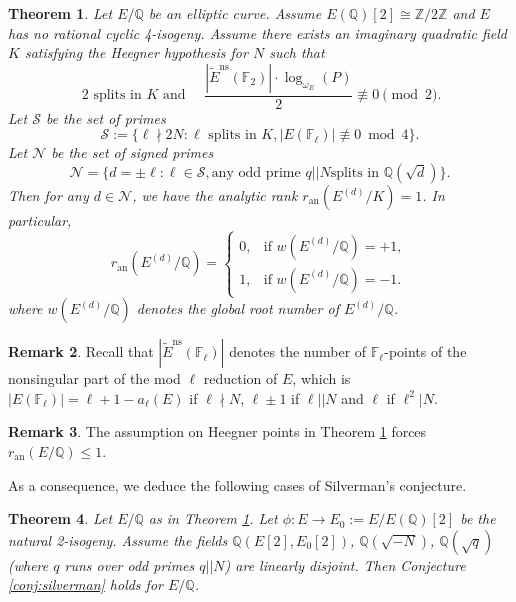 \documentclass[11pt]{amsart}
\newtheorem{theorem}{Theorem}[section]
\theoremstyle{definition}
\newtheorem{remark}[theorem]{Remark}
\begin{document}
\begin{theorem}\label{thm:criterion}
Let $E/\mathbb{Q}$ be an elliptic curve. Assume $E(\mathbb{Q})[2]\cong \mathbb{Z}/2 \mathbb{Z}$ and $E$ has no rational cyclic 4-isogeny. Assume there exists an imaginary quadratic field $K$ satisfying the Heegner hypothesis for $N$ such that
  \begin{equation}
    \label{eq:star}\
2\text{ splits in } K \text{ and }\quad \frac{|\tilde E^\mathrm{ns}(\mathbb{F}_2)|\cdot\log_{\omega_E}(P)}{2}\not\equiv0\pmod{2}.     \tag{$\bigstar$}
\end{equation} Let $\mathcal{S}$ be the set of primes $$\mathcal{S}:=\{\ell\nmid 2N: \ell\text{ splits in } K, |E(\mathbb{F}_\ell)|\not\equiv 0\bmod{4} \}.$$ Let $\mathcal{N}$ be the set of signed primes $$\mathcal{N}=\{d=\pm \ell: \ell \in \mathcal{S}, \text{any odd prime }q||N \text{splits  in } \mathbb{Q}(\sqrt{d})\}.$$%
Then for any $d\in \mathcal{\mathcal{N}}$, we have the analytic rank $r_\mathrm{an}(E^{(d)}/K)=1$. In particular, $$r_\mathrm{an}(E^{(d)}/\mathbb{Q})=
\begin{cases}
  0 , & \text{if }w(E^{(d)}/\mathbb{Q})=+1, \\
  1, & \text{if } w(E^{(d)}/\mathbb{Q})=-1.
\end{cases}$$
 where $w(E^{(d)}/\mathbb{Q})$ denotes the global root number of $E^{(d)}/\mathbb{Q}$.
\end{theorem}

\begin{remark}
  Recall that $|\tilde E^\mathrm{ns}(\mathbb{F}_\ell)|$ denotes the number of $\mathbb{F}_\ell$-points of the nonsingular part of the mod $\ell$ reduction of $E$, which is $|E(\mathbb{F}_\ell)|=\ell+1-a_\ell(E)$ if $\ell\nmid N$, $\ell\pm1$ if $\ell|| N$ and $\ell$ if $\ell^2|N$. 
\end{remark}

\begin{remark}
  The assumption on Heegner points in Theorem \ref{thm:criterion} forces $r_\mathrm{an}(E/\mathbb{Q})\le1$.
\end{remark}

As a consequence, we deduce the following cases of Silverman's conjecture.

\begin{theorem}\label{thm:mod4}
  Let $E/\mathbb{Q}$ as in Theorem \ref{thm:criterion}. Let $\phi: E\rightarrow E_0:=E/E(\mathbb{Q})[2]$ be the natural 2-isogeny. Assume the fields $\mathbb{Q}(E[2], E_0[2])$, $\mathbb{Q}(\sqrt{-N})$, $\mathbb{Q}(\sqrt{q})$ (where $q$ runs over odd primes $q||N$) are linearly disjoint.   Then Conjecture \ref{conj:silverman} holds for $E/\mathbb{Q}$.
\end{theorem}
\end{document}
